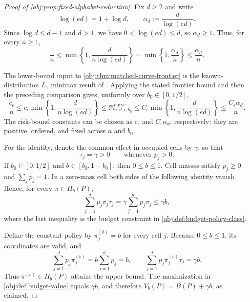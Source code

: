 \documentclass[11pt]{article}
\begin{document}
\begin{proof}[Proof of \cref{obj:prop:fixed-alphabet-reduction}]
Fix \(d\ge2\) and write
\[
\log(ed)=1+\log d,\qquad
\alpha_d:=\frac{d}{\log(ed)}.
\]
Since \(\log d\le d-1\) and \(d>1\), we have \(0<\log(ed)\le d\), so \(\alpha_d\ge1\). Thus, for every \(n\ge1\),
\[
\frac1n
\le \min\left\{1,\frac{d}{n\log(ed)}\right\}
=\min\left\{1,\frac{\alpha_d}{n}\right\}
\le\frac{\alpha_d}{n}.
\]

The lower-bound input to \cref{obj:thm:matched-curve-frontier} is the known-distribution \(L_1\) minimax result of \citep[Theorem 3 and the unknown-both-distributions reduction following Theorem 6]{JiaoHanWeissman2018}. Applying the stated frontier bound and then the preceding comparison gives, uniformly over \(b_0\in[0,1/2]\),
\[
\frac{c_\epsilon}{n}
\le c_\epsilon\min\left\{1,\frac{d}{n\log(ed)}\right\}
\le \mathfrak R_{n,d,\epsilon,b_0}^{\mathrm{curve}}
\le C_\epsilon\min\left\{1,\frac{d}{n\log(ed)}\right\}
\le\frac{C_\epsilon\alpha_d}{n}.
\]
The risk-bound constants can be chosen as \(c_\epsilon\) and \(C_\epsilon\alpha_d\), respectively; they are positive, ordered, and fixed across \(n\) and \(b_0\).

For the identity, denote the common effect in occupied cells by \(\gamma\), so that
\[
\tau_j=\gamma>0\qquad\text{whenever }p_j>0.
\]
If \(b_0\in[0,1/2]\) and \(b\in[b_0,1-b_0]\), then \(0\le b\le1\). Cell masses satisfy \(p_j\ge0\) and \(\sum_jp_j=1\). In a zero-mass cell both sides of the following identity vanish. Hence, for every \(\pi\in\Pi_b(P)\),
\[
\sum_{j=1}^d p_j\pi_j\tau_j
=\gamma\sum_{j=1}^d p_j\pi_j
\le \gamma b,
\]
where the last inequality is the budget constraint in \cref{obj:def:budget-policy-class}.

Define the constant policy by \(\pi^{(b)}_j=b\) for every cell \(j\). Because \(0\le b\le1\), its coordinates are valid, and
\[
\sum_{j=1}^d p_j\pi^{(b)}_j
=b\sum_{j=1}^d p_j=b,
\qquad
\sum_{j=1}^d p_j\pi^{(b)}_j\tau_j
=\gamma b.
\]
Thus \(\pi^{(b)}\in\Pi_b(P)\) attains the upper bound. The maximization in \cref{obj:def:budget-value} equals \(\gamma b\), and therefore \(V_b(P)=B(P)+\gamma b\), as claimed.
\end{proof}
\end{document}
